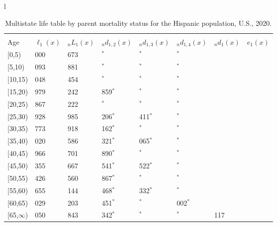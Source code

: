 \documentclass[
]{article}
\begin{document}
\begin{table}
\caption{\label{tab:table-hispanic}Multistate life table by parent mortality status for the Hispanic population, U.S., 2020.}

\centering
\fontsize{9}{11}\selectfont
\begin{tabular}[t]{l}
\hline
\begin{tabular}{>{\raggedright\arraybackslash}p{.45in}>{\raggedleft\arraybackslash}p{.65in}>{\raggedleft\arraybackslash}p{.65in}>{\raggedleft\arraybackslash}p{.65in}>{\raggedleft\arraybackslash}p{.65in}>{\raggedleft\arraybackslash}p{.65in}>{\raggedleft\arraybackslash}p{.65in}>{\raggedleft\arraybackslash}p{.65in}}
\toprule
\multicolumn{1}{c}{ } & \multicolumn{7}{c}{(1) Lost neither} \\
\cmidrule(l{3pt}r{3pt}){2-8}
Age & $\ell_{1}(x)$ & ${}_nL_{1}(x)$ & ${}_nd_{1,2}(x)$ & ${}_nd_{1,3}(x)$ & ${}_nd_{1,4}(x)$ & ${}_nd_{1}(x)$ & $e_{1}(x)$\\
\midrule
{}[0,5) & 100 000 & 496 673 & 368$^{*}$ & 0$^{*}$ & 0$^{*}$ & 539 & 46\\
{}[5,10) & 99 093 & 491 881 & 0$^{*}$ & 0$^{*}$ & 0$^{*}$ & 44 & 41\\
{}[10,15) & 99 048 & 483 454 & 0$^{*}$ & 0$^{*}$ & 0$^{*}$ & 69 & 36\\
{}[15,20) & 98 979 & 476 242 & 1 859$^{*}$ & 0$^{*}$ & 0$^{*}$ & 254 & 31\\
{}[20,25) & 96 867 & 470 222 & 905$^{*}$ & 579$^{*}$ & 0$^{*}$ & 455 & 26\\
\addlinespace
{}[25,30) & 94 928 & 440 985 & 1 206$^{*}$ & 1 411$^{*}$ & 0$^{*}$ & 538 & 22\\
{}[30,35) & 91 773 & 405 918 & 3 162$^{*}$ & 0$^{*}$ & 0$^{*}$ & 591 & 17\\
{}[35,40) & 88 020 & 370 586 & 5 321$^{*}$ & 2 065$^{*}$ & 0$^{*}$ & 668 & 13\\
{}[40,45) & 79 966 & 308 701 & 4 890$^{*}$ & 0$^{*}$ & 0$^{*}$ & 722 & 10\\
{}[45,50) & 74 355 & 255 667 & 5 541$^{*}$ & 1 522$^{*}$ & 0$^{*}$ & 866 & 7\\
\addlinespace
{}[50,55) & 66 426 & 176 560 & 8 867$^{*}$ & 0$^{*}$ & 0$^{*}$ & 904 & 4\\
{}[55,60) & 56 655 & 104 144 & 2 468$^{*}$ & 1 332$^{*}$ & 0$^{*}$ & 826 & 2\\
{}[60,65) & 52 029 & 44 203 & 2 451$^{*}$ & 0$^{*}$ & 1 002$^{*}$ & 526 & 1\\
{}[65,$\infty$) & 48 050 & 39 843 & 4 342$^{*}$ & 0$^{*}$ & 0$^{*}$ & 2 117 & 0\\

\end{tabular}
\end{tabular}
\end{table}
\end{document}
